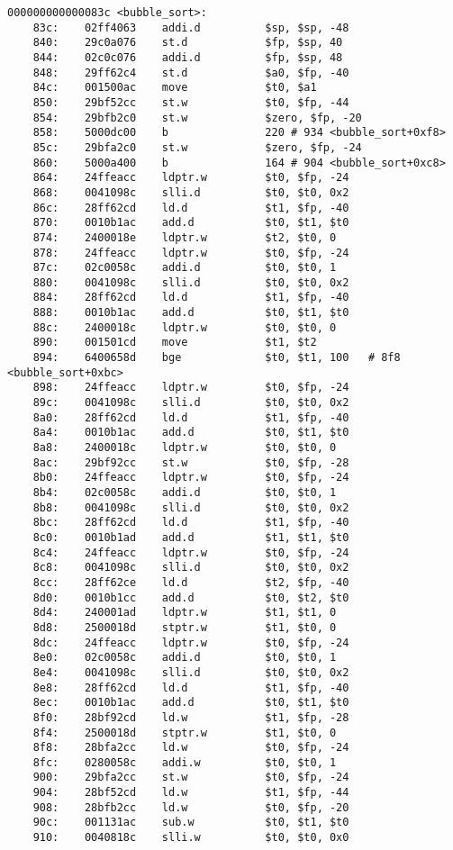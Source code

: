 \documentclass[UTF8]{report}
\begin{document}
  \begin{lstlisting}[language=LoongArch]
    000000000000083c <bubble_sort>:
    83c:	02ff4063 	addi.d      	$sp, $sp, -48
    840:	29c0a076 	st.d        	$fp, $sp, 40
    844:	02c0c076 	addi.d      	$fp, $sp, 48
    848:	29ff62c4 	st.d        	$a0, $fp, -40
    84c:	001500ac 	move        	$t0, $a1
    850:	29bf52cc 	st.w        	$t0, $fp, -44
    854:	29bfb2c0 	st.w        	$zero, $fp, -20
    858:	5000dc00 	b           	220	# 934 <bubble_sort+0xf8>
    85c:	29bfa2c0 	st.w        	$zero, $fp, -24
    860:	5000a400 	b           	164	# 904 <bubble_sort+0xc8>
    864:	24ffeacc 	ldptr.w     	$t0, $fp, -24
    868:	0041098c 	slli.d      	$t0, $t0, 0x2
    86c:	28ff62cd 	ld.d        	$t1, $fp, -40
    870:	0010b1ac 	add.d       	$t0, $t1, $t0
    874:	2400018e 	ldptr.w     	$t2, $t0, 0
    878:	24ffeacc 	ldptr.w     	$t0, $fp, -24
    87c:	02c0058c 	addi.d      	$t0, $t0, 1
    880:	0041098c 	slli.d      	$t0, $t0, 0x2
    884:	28ff62cd 	ld.d        	$t1, $fp, -40
    888:	0010b1ac 	add.d       	$t0, $t1, $t0
    88c:	2400018c 	ldptr.w     	$t0, $t0, 0
    890:	001501cd 	move        	$t1, $t2
    894:	6400658d 	bge         	$t0, $t1, 100	# 8f8 <bubble_sort+0xbc>
    898:	24ffeacc 	ldptr.w     	$t0, $fp, -24
    89c:	0041098c 	slli.d      	$t0, $t0, 0x2
    8a0:	28ff62cd 	ld.d        	$t1, $fp, -40
    8a4:	0010b1ac 	add.d       	$t0, $t1, $t0
    8a8:	2400018c 	ldptr.w     	$t0, $t0, 0
    8ac:	29bf92cc 	st.w        	$t0, $fp, -28
    8b0:	24ffeacc 	ldptr.w     	$t0, $fp, -24
    8b4:	02c0058c 	addi.d      	$t0, $t0, 1
    8b8:	0041098c 	slli.d      	$t0, $t0, 0x2
    8bc:	28ff62cd 	ld.d        	$t1, $fp, -40
    8c0:	0010b1ad 	add.d       	$t1, $t1, $t0
    8c4:	24ffeacc 	ldptr.w     	$t0, $fp, -24
    8c8:	0041098c 	slli.d      	$t0, $t0, 0x2
    8cc:	28ff62ce 	ld.d        	$t2, $fp, -40
    8d0:	0010b1cc 	add.d       	$t0, $t2, $t0
    8d4:	240001ad 	ldptr.w     	$t1, $t1, 0
    8d8:	2500018d 	stptr.w     	$t1, $t0, 0
    8dc:	24ffeacc 	ldptr.w     	$t0, $fp, -24
    8e0:	02c0058c 	addi.d      	$t0, $t0, 1
    8e4:	0041098c 	slli.d      	$t0, $t0, 0x2
    8e8:	28ff62cd 	ld.d        	$t1, $fp, -40
    8ec:	0010b1ac 	add.d       	$t0, $t1, $t0
    8f0:	28bf92cd 	ld.w        	$t1, $fp, -28
    8f4:	2500018d 	stptr.w     	$t1, $t0, 0
    8f8:	28bfa2cc 	ld.w        	$t0, $fp, -24
    8fc:	0280058c 	addi.w      	$t0, $t0, 1
    900:	29bfa2cc 	st.w        	$t0, $fp, -24
    904:	28bf52cd 	ld.w        	$t1, $fp, -44
    908:	28bfb2cc 	ld.w        	$t0, $fp, -20
    90c:	001131ac 	sub.w       	$t0, $t1, $t0
    910:	0040818c 	slli.w      	$t0, $t0, 0x0

\end{lstlisting}
\end{document}
